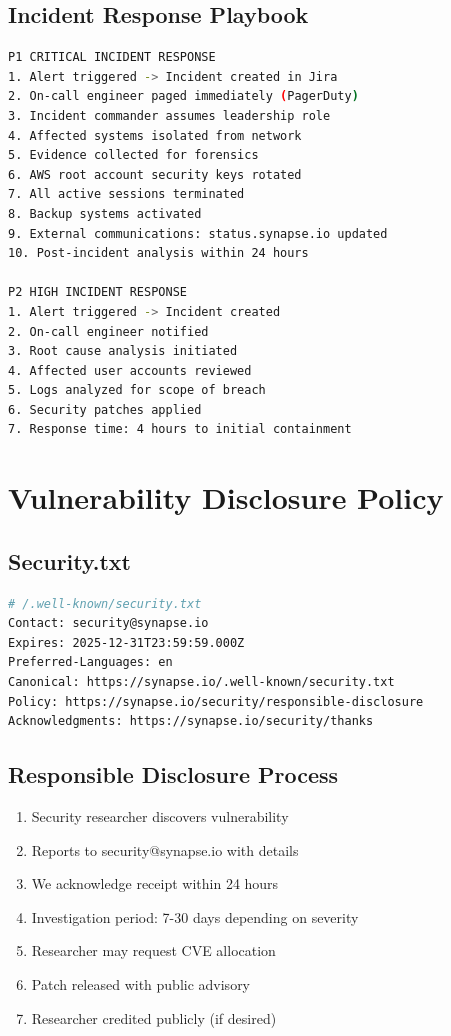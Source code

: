 \documentclass{report}
\begin{document}
\subsection{Incident Response Playbook}
\begin{lstlisting}[language=bash]
P1 CRITICAL INCIDENT RESPONSE
1. Alert triggered -> Incident created in Jira
2. On-call engineer paged immediately (PagerDuty)
3. Incident commander assumes leadership role
4. Affected systems isolated from network
5. Evidence collected for forensics
6. AWS root account security keys rotated
7. All active sessions terminated
8. Backup systems activated
9. External communications: status.synapse.io updated
10. Post-incident analysis within 24 hours

P2 HIGH INCIDENT RESPONSE
1. Alert triggered -> Incident created
2. On-call engineer notified
3. Root cause analysis initiated
4. Affected user accounts reviewed
5. Logs analyzed for scope of breach
6. Security patches applied
7. Response time: 4 hours to initial containment
\end{lstlisting}

\section{Vulnerability Disclosure Policy}

\subsection{Security.txt}
\begin{lstlisting}[language=bash]
# /.well-known/security.txt
Contact: security@synapse.io
Expires: 2025-12-31T23:59:59.000Z
Preferred-Languages: en
Canonical: https://synapse.io/.well-known/security.txt
Policy: https://synapse.io/security/responsible-disclosure
Acknowledgments: https://synapse.io/security/thanks
\end{lstlisting}

\subsection{Responsible Disclosure Process}
\begin{enumerate}
\item Security researcher discovers vulnerability
\item Reports to security@synapse.io with details
\item We acknowledge receipt within 24 hours
\item Investigation period: 7-30 days depending on severity
\item Researcher may request CVE allocation
\item Patch released with public advisory
\item Researcher credited publicly (if desired)
\end{enumerate}
\end{document}
